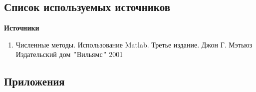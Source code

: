 \documentclass[14pt, titlepage, a4paper]{extarticle} %
\begin{document}
	\pagebreak

	
	\subsection*{Список используемых источников}
	
	\textbf{Источники}
	\begin{enumerate}
		\item Численные методы. Использование Matlab. Третье издание. Джон Г. Мэтьюз Издательский дом $"$Вильямс$"$ 2001
	\end{enumerate}
	
	\pagebreak
	
	
	\subsection*{Приложения}
	
	\pagebreak	
	
	
\end{document}
